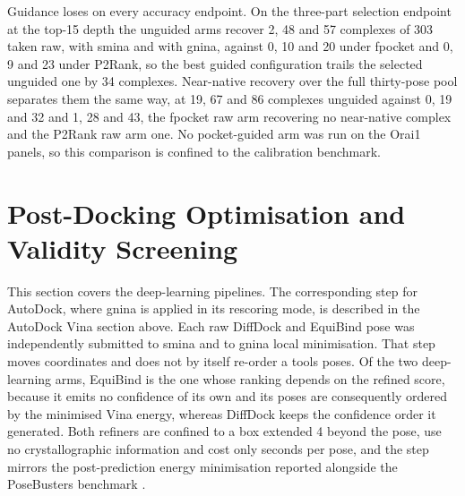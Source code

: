 Guidance loses on every accuracy endpoint. On the three-part selection endpoint at the top-15 depth the unguided arms recover 2, 48 and 57 complexes of 303 taken raw, with smina and with gnina, against 0, 10 and 20 under fpocket and 0, 9 and 23 under P2Rank, so the best guided configuration trails the selected unguided one by 34 complexes. Near-native recovery over the full thirty-pose pool separates them the same way, at 19, 67 and 86 complexes unguided against 0, 19 and 32 and 1, 28 and 43, the fpocket raw arm recovering no near-native complex and the P2Rank raw arm one. No pocket-guided arm was run on the Orai1 panels, so this comparison is confined to the calibration benchmark.

\hypertarget{post-docking-optimisation-and-validity-screening}{%
\section{Post-Docking Optimisation and Validity Screening}\label{post-docking-optimisation-and-validity-screening}}

This section covers the deep-learning pipelines. The corresponding step for AutoDock, where gnina is applied in its rescoring mode, is described in the AutoDock Vina section above. Each raw DiffDock and EquiBind pose was independently submitted to smina and to gnina local minimisation. That step moves coordinates and does not by itself re-order a tool\textquotesingle s poses. Of the two deep-learning arms, EquiBind is the one whose ranking depends on the refined score, because it emits no confidence of its own and its poses are consequently ordered by the minimised Vina energy, whereas DiffDock keeps the confidence order it generated. Both refiners are confined to a box extended 4\angstrom{} beyond the pose, use no crystallographic information and cost only seconds per pose, and the step mirrors the post-prediction energy minimisation reported alongside the PoseBusters benchmark \cite{ref035}.

